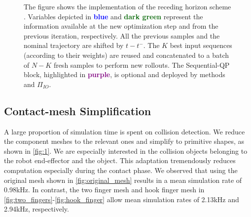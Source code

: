 \begin{figure}[t]
    \vspace{0.1cm}
    \caption{The figure shows the implementation of the receding horizon scheme . Variables depicted in \textcolor{blue}{\textbf{blue}} and \textcolor{darkgreen}{\textbf{dark green}} represent the information available at the new optimization step and from the previous iteration, respectively. All the previous samples and the nominal trajectory are shifted by $ t - t^-$. The $K$ best input sequences (according to their weights) are reused and concatenated to a batch of $N-K$ fresh samples to perform new rollouts. The Sequential-QP block, highlighted in \textcolor{purple}{\textbf{purple}}, is optional and deployed by methods \ctrlOuter and $\Pi_{IO}$.}
    \label{fig:receding_horizon}
\end{figure}

\subsection{Contact-mesh Simplification}
A large proportion of simulation time is spent on collision detection. We reduce the component meshes to the relevant ones and simplify to primitive shapes, as shown in \fig\ref{fig:1}. We are especially interested in the collision objects belonging to the robot end-effector and the object. This adaptation tremendously reduces computation especially during the contact phase.  We observed that using the original mesh shown in \fig\ref{fig:original_mesh} results in a mean simulation rate of 0.98kHz. In contrast, the two finger mesh and hook finger mesh in \fig\ref{fig:two_fingers}-\ref{fig:hook_finger} allow mean simulation rates of 2.13kHz and 2.94kHz, respectively.

